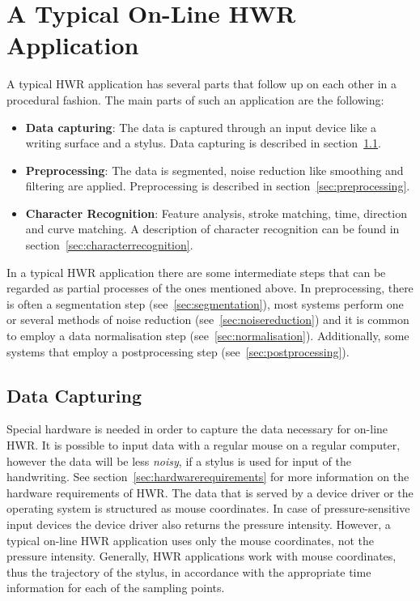 \section{A Typical On-Line HWR Application}
\label{sec:atypicalonlinehwrapplication}

A typical HWR application has several parts that follow up on each other in a
procedural fashion. The main parts of such an application are the following:
\begin{itemize}
\item \textbf{Data capturing}: The data is captured through an input device 
  like a writing surface and a stylus. Data capturing is described in
  section~\ref{sec:datacapturing}.
\item \textbf{Preprocessing}: The data is segmented, noise reduction like 
  smoothing and filtering are applied. Preprocessing is described in 
  section~\ref{sec:preprocessing}.
\item \textbf{Character Recognition}: Feature analysis, stroke matching, time, 
  direction and curve matching. A description of character recognition can be 
  found in section~\ref{sec:characterrecognition}.
\end{itemize}
In a typical HWR application there are some intermediate steps that can be 
regarded as partial processes of the ones mentioned above. In preprocessing,
there is often a segmentation step (see~\ref{sec:segmentation}), most systems 
perform one or several methods of noise reduction (see~\ref{sec:noisereduction}) and it is common to employ a data normalisation step 
(see~\ref{sec:normalisation}). Additionally, some systems that employ a 
postprocessing step (see~\ref{sec:postprocessing}). 

\subsection{Data Capturing}
\label{sec:datacapturing}

Special hardware is needed in order to capture the data necessary 
for on-line HWR. It is possible to input data with a regular mouse on 
a regular computer, however the data will be less \emph{noisy}, 
if a stylus is used for input of the handwriting. 
See section~\ref{sec:hardwarerequirements} for more information on the hardware 
requirements of HWR. The data that is served by a device driver or the operating
system is structured as mouse coordinates. In case of pressure-sensitive input 
devices the device driver also returns the pressure intensity. 
However, a typical on-line HWR application uses only the mouse coordinates,
not the pressure intensity. Generally, HWR applications work with mouse
coordinates, thus the trajectory of the stylus, in accordance with the 
appropriate time information for each of the sampling points. 

